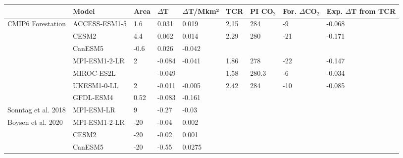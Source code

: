 \documentclass[]{article}
\begin{document}
\begin{table}[]
\begin{tabular}{ll|lllllll}
\hline
                     & Model         & Area & $\Delta$T & $\Delta$T/Mkm² & TCR & PI CO$_2$ & For. $\Delta$CO$_2$ & Exp. $\Delta$T from TCR \\ \hline
CMIP6 Forestation    & ACCESS-ESM1-5 & 1.6          & 0.031     & 0.019   & 2.15    & 284               & -9                        & -0.068                         \\
                     & CESM2         & 4.4          & 0.062     & 0.014   & 2.29    & 280               & -21                       & -0.171                         \\
                     & CanESM5       & -0.6         & 0.026     & -0.042  &         &                   &                           &                                \\
                     & MPI-ESM1-2-LR & 2            & -0.084    & -0.041  & 1.86    & 278               & -22                       & -0.147                         \\
                     & MIROC-ES2L    &              & -0.049    &         & 1.58    & 280.3             & -6                        & -0.034                         \\
                     & UKESM1-0-LL   & 2            & -0.011    & -0.005  & 2.42    & 284               & -10                       & -0.085                         \\
                     & GFDL-ESM4     & 0.52         & -0.083    & -0.161  &         &                   &                           &                                \\ \hline
Sonntag et al. 2018 & MPI-ESM-LR       & 9            & -0.27     & -0.03   &         &                   &                           &                                \\ \hline
Boysen et al. 2020 & MPI-ESM1-2-LR       & -20          & -0.04     & 0.002   &         &                   &                           &                                \\
                     & CESM2         & -20          & -0.02     & 0.001   &         &                   &                           &                                \\
                     & CanESM5        & -20          & -0.55     & 0.0275  &         &                   &                           &                                \\

\end{tabular}
\end{table}
\end{document}
